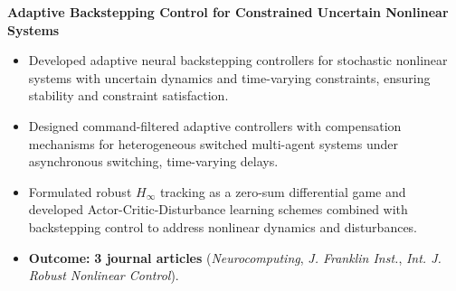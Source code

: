 \documentclass[a4paper,11pt]{article}
\newcommand{\externallink}[2]{%
	#2\nobreak\hspace{0.16em}%
	\href{#1}{\textcolor{ExternalArrowColor}{%
			\faIcon{external-link-alt}}}%
}
\begin{document}
\begin{enumerate}[leftmargin=0.2in]
	\small{
		\item {\textbf{\externallink{https://feith0306.github.io/about/research/backstepping-control/}{Adaptive Backstepping Control for Constrained Uncertain Nonlinear Systems}}}
		\begin{itemize}[leftmargin=0in]
			\item %
			Developed adaptive neural backstepping controllers for stochastic nonlinear systems with uncertain dynamics and time-varying constraints, ensuring stability and constraint satisfaction.
			\item %
			Designed command-filtered adaptive controllers with compensation mechanisms for heterogeneous switched multi-agent systems under asynchronous switching, time-varying delays.
			\item %
			Formulated robust $H_\infty$ tracking as a zero-sum differential game and developed Actor-Critic-Disturbance learning schemes combined with backstepping control to address nonlinear dynamics and disturbances.
			\item \textbf{Outcome:}
			\textbf{3 journal articles}
			(\textit{Neurocomputing},
			\textit{J. Franklin Inst.},
			\textit{Int. J. Robust Nonlinear Control}).
		\end{itemize}
		
}
\end{enumerate}
\end{document}
